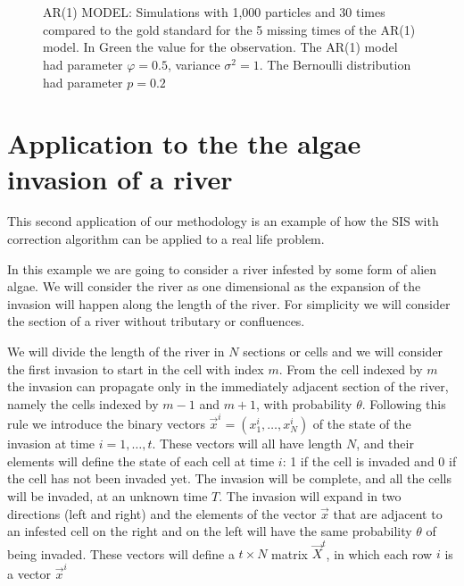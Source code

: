 \begin{figure*}
 \\
 \\
\caption{AR(1) MODEL: Simulations with 1,000 particles and 30 times compared to the gold standard for the 5 missing times of the AR(1) model. In Green the value for the observation. The AR(1) model had parameter $\varphi = 0.5$, variance $\sigma^2 = 1$. The Bernoulli distribution had parameter $p = 0.2$}
\label{fig:1}       %
\end{figure*}
%

\section{Application to the the algae invasion of a river}

This second application of our methodology is an example of how the SIS with correction algorithm can be applied to a real life problem. 

In this example we are going to consider a river infested by some form of alien algae. We will consider the river as one dimensional as the expansion of the invasion will happen along the length of the river. For simplicity we will consider the section of a river without tributary or confluences. 

We will divide the length of the river in $N$ sections or cells and we will consider the first invasion to start in the cell with index $m$.
From the cell indexed by $m$ the invasion can propagate only in the immediately adjacent section of the river, namely the cells indexed by $m-1$ and $m+1$, with probability $\theta$. Following this rule we introduce the binary vectors $\vec{x}^{i} = (x_1^{i}, \dots, x_{N}^{i})$ of the state of the invasion at time $i = 1, \dots, t$. These vectors will all have length $N$, and their elements will define the state of each cell at time $i$: 1 if the cell is invaded and 0 if the cell has not been invaded yet. The invasion will be complete, and all the cells will be invaded, at an unknown time $T$. 
The invasion will expand in two directions (left and right) and the elements of the vector $\vec{x}$ that are adjacent to an infested cell on the right and on the left will have the same probability $\theta$ of being invaded. These vectors will define a $t\times N$ matrix $\vec{X}^{t}$, in which each row $i$ is a vector $\vec{x}^{i}$

